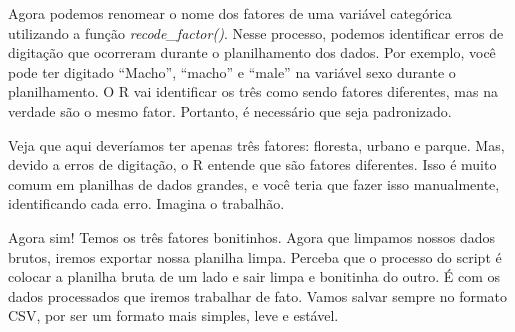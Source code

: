 \documentclass[
]{book}
\newenvironment{Shaded}{\begin{snugshade}}{\end{snugshade}}
\newcommand{\AttributeTok}[1]{\textcolor[rgb]{0.13,0.29,0.53}{#1}}
\newcommand{\CommentTok}[1]{\textcolor[rgb]{0.56,0.35,0.01}{\textit{#1}}}
\newcommand{\FunctionTok}[1]{\textcolor[rgb]{0.13,0.29,0.53}{\textbf{#1}}}
\newcommand{\NormalTok}[1]{#1}
\newcommand{\OtherTok}[1]{\textcolor[rgb]{0.56,0.35,0.01}{#1}}
\newcommand{\SpecialCharTok}[1]{\textcolor[rgb]{0.81,0.36,0.00}{\textbf{#1}}}
\newcommand{\StringTok}[1]{\textcolor[rgb]{0.31,0.60,0.02}{#1}}
\begin{document}
Agora podemos renomear o nome dos fatores de uma variável categórica utilizando a função \emph{recode\_factor()}. Nesse processo, podemos identificar erros de digitação que ocorreram durante o planilhamento dos dados. Por exemplo, você pode ter digitado ``Macho'', ``macho'' e ``male'' na variável sexo durante o planilhamento. O R vai identificar os três como sendo fatores diferentes, mas na verdade são o mesmo fator. Portanto, é necessário que seja padronizado.

\begin{Shaded}
\end{Shaded}

Veja que aqui deveríamos ter apenas três fatores: floresta, urbano e parque. Mas, devido a erros de digitação, o R entende que são fatores diferentes. Isso é muito comum em planilhas de dados grandes, e você teria que fazer isso manualmente, identificando cada erro. Imagina o trabalhão.

\begin{Shaded}
\end{Shaded}

Agora sim! Temos os três fatores bonitinhos. Agora que limpamos nossos dados brutos, iremos exportar nossa planilha limpa. Perceba que o processo do script é colocar a planilha bruta de um lado e sair limpa e bonitinha do outro. É com os dados processados que iremos trabalhar de fato. Vamos salvar sempre no formato CSV, por ser um formato mais simples, leve e estável.
\end{document}
